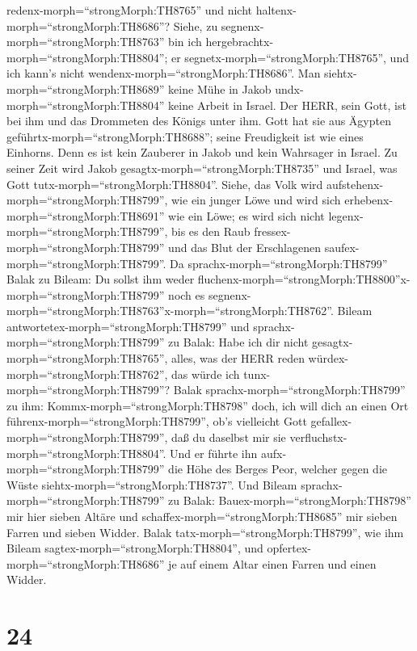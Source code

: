 redenx-morph=``strongMorph:TH8765'' und nicht
haltenx-morph=``strongMorph:TH8686''?  Siehe, zu
segnenx-morph=``strongMorph:TH8763'' bin ich
hergebrachtx-morph=``strongMorph:TH8804''; er
segnetx-morph=``strongMorph:TH8765'', und ich kann's nicht
wendenx-morph=``strongMorph:TH8686''.  Man
siehtx-morph=``strongMorph:TH8689'' keine Mühe in Jakob
undx-morph=``strongMorph:TH8804'' keine Arbeit in Israel. Der HERR, sein
Gott, ist bei ihm und das Drommeten des Königs unter ihm. 
Gott hat sie aus Ägypten geführtx-morph=``strongMorph:TH8688''; seine
Freudigkeit ist wie eines Einhorns.  Denn es ist kein
Zauberer in Jakob und kein Wahrsager in Israel. Zu seiner Zeit wird
Jakob gesagtx-morph=``strongMorph:TH8735'' und Israel, was Gott
tutx-morph=``strongMorph:TH8804''.  Siehe, das Volk wird
aufstehenx-morph=``strongMorph:TH8799'', wie ein junger Löwe und wird
sich erhebenx-morph=``strongMorph:TH8691'' wie ein Löwe; es wird sich
nicht legenx-morph=``strongMorph:TH8799'', bis es den Raub
fressex-morph=``strongMorph:TH8799'' und das Blut der Erschlagenen
saufex-morph=``strongMorph:TH8799''.  Da
sprachx-morph=``strongMorph:TH8799'' Balak zu Bileam: Du sollst ihm
weder
fluchenx-morph=``strongMorph:TH8800''x-morph=``strongMorph:TH8799'' noch
es segnenx-morph=``strongMorph:TH8763''x-morph=``strongMorph:TH8762''.
 Bileam antwortetex-morph=``strongMorph:TH8799'' und
sprachx-morph=``strongMorph:TH8799'' zu Balak: Habe ich dir nicht
gesagtx-morph=``strongMorph:TH8765'', alles, was der HERR reden
würdex-morph=``strongMorph:TH8762'', das würde ich
tunx-morph=``strongMorph:TH8799''?  Balak
sprachx-morph=``strongMorph:TH8799'' zu ihm:
Kommx-morph=``strongMorph:TH8798'' doch, ich will dich an einen Ort
führenx-morph=``strongMorph:TH8799'', ob's vielleicht Gott
gefallex-morph=``strongMorph:TH8799'', daß du daselbst mir sie
verfluchstx-morph=``strongMorph:TH8804''.  Und er führte
ihn aufx-morph=``strongMorph:TH8799'' die Höhe des Berges Peor, welcher
gegen die Wüste siehtx-morph=``strongMorph:TH8737''.  Und
Bileam sprachx-morph=``strongMorph:TH8799'' zu Balak:
Bauex-morph=``strongMorph:TH8798'' mir hier sieben Altäre und
schaffex-morph=``strongMorph:TH8685'' mir sieben Farren und sieben
Widder.  Balak tatx-morph=``strongMorph:TH8799'', wie ihm
Bileam sagtex-morph=``strongMorph:TH8804'', und
opfertex-morph=``strongMorph:TH8686'' je auf einem Altar einen Farren
und einen Widder.

\hypertarget{section-23}{%
\section{24}\label{section-23}}

